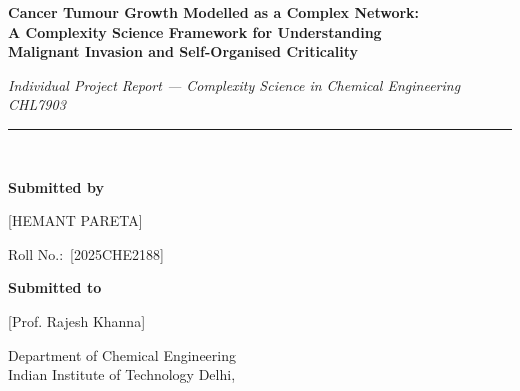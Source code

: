 \documentclass[12pt,a4paper]{article}
\begin{document}

\begin{titlepage}
\centering
\vspace*{1.2cm}
{\LARGE\bfseries \textbf{Cancer Tumour Growth Modelled as a Complex Network}:\\[8pt]
A Complexity Science Framework for Understanding\\[4pt]
Malignant Invasion and Self-Organised Criticality\par}
\vspace{1.4cm}
{\large\textit{Individual Project Report —  Complexity Science in Chemical Engineering CHL7903}\par}
\vspace{2.0cm}
\rule{0.55\linewidth}{1pt}\\[0.5cm]
{\large\textbf{Submitted by}\par}
\vspace{0.3cm}
{\large [HEMANT PARETA]\par}
{\normalsize Roll No.:\ [2025CHE2188]\par}
\vspace{1.4cm}
{\large\textbf{Submitted to}\par}
\vspace{0.3cm}
{\large [Prof. Rajesh Khanna]\par}
{\normalsize Department of Chemical Engineering\\[2pt] Indian Institute of Technology Delhi, \par}
\vspace{1.8cm}


\end{titlepage}
\end{document}
